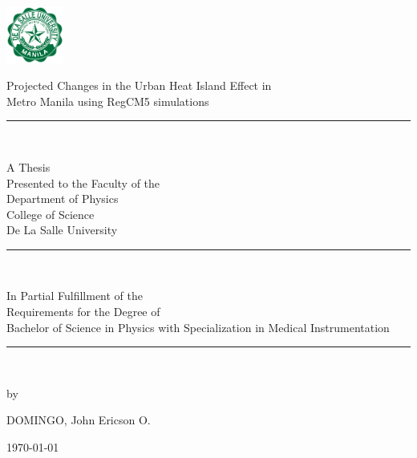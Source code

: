 \begin{center}

	\includegraphics[width=0.14\textwidth]{../format/DLSU_Logo} 
	\vspace{4ex}
	
	\begin{Spacing}{1.5} 
		Projected Changes in the Urban Heat Island Effect in \\
		Metro Manila using RegCM5 simulations
	\end{Spacing}
	\vfill
	
	\rule{3cm}{0.5pt}\\
	\vfill
	
	
	A Thesis \\
	Presented to the Faculty of the \\
	Department of Physics \\
	College of Science \\
	De La Salle University \\
	\vfill
	
	\rule{3cm}{0.5pt}\\
	\vfill
	
	In Partial Fulfillment of the\\
	Requirements for the Degree of\\
	Bachelor of Science in Physics with Specialization in Medical Instrumentation\\
	\vfill
	
	\rule{3cm}{0.5pt}\\
	\vfill
	
	by \\
	\vspace{2.5ex}
	
	DOMINGO, John Ericson O.
	\vspace{2.5ex}
	
	\today \\
\end{center}

\clearpage
